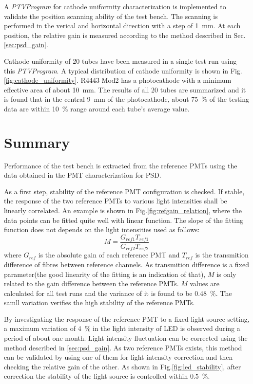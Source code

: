 \documentclass[5p, times]{elsarticle}
\begin{document}
A \textit{PTVProgram} for cathode uniformity characterization is implemented to validate the position scanning ability of the test bench.
The scanning is performed in the verical and horizontal direction with a step of \SI{1}{\milli\meter}.
At each position, the relative gain is measured according to the method described in Sec.\ref{sec:psd_gain}.

Cathode uniformity of 20 tubes have been measured in a single test run using this \textit{PTVProgram}.
A typical distribution of cathode uniformity is shown in Fig.\ref{fig:cathode_uniformity}.
R4443 Mod2 has a photocathode with a minimum effective area of about \SI{10}{\milli\meter}.
The results of all 20 tubes are summarized and it is found that in the central \SI{9}{\milli\meter} of the photocathode, about \SI{75}{\percent} of the testing data are within \textpm\SI{10}{\percent} range around each tube's average value.

\section{Summary}
\label{sec:summary}

Performance of the test bench is extracted from the reference PMTs using the data obtained in the PMT characterization for PSD.

As a first step, stability of the reference PMT configuration is checked.
If stable, the response of the two reference PMTs to various light intensities shall be linearly correlated.
An example is shown in Fig.\ref{fig:refgain_relation}, where the data points can be fitted quite well with linear function.
The slope of the fitting function does not depends on the light intensities used as follows:
\begin{equation}
 M = \frac{G_{ref1} T_{ref1}}{G_{ref2} T_{ref2}}
\end{equation}
where $G_{ref}$ is the absolute gain of each reference PMT and $T_{ref}$ is the transmition difference of fibres between reference channels.
As transmition difference is a fixed parameter(the good linearity of the fitting is an indication of that), $M$ is only related to the gain difference between the reference PMTs.
$M$ values are calculated for all test runs and the variance of it is found to be \SI{0.48}{\percent}.
The samll variation verifies the high stability of the reference PMTs.

By investigating the response of the reference PMT to a fixed light source setting, a maximum variation of \SI{4}{\percent} in the light intensity of LED is observed during a period of about one month.
Light intensity fluctuation can be corrected using the method described in \ref{sec:psd_gain}.
As two reference PMTs exists, this method can be validated by using one of them for light intensity correction and then checking the relative gain of the other. 
As shown in Fig.\ref{fig:led_stability}, after correction the stability of the light source is controlled within \textpm\SI{0.5}{\percent}.
\end{document}
